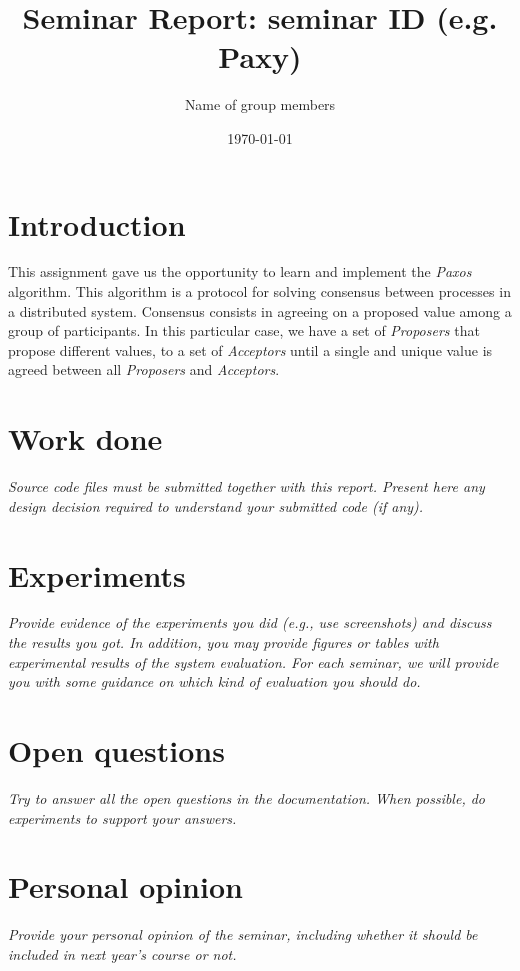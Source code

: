 \documentclass[a4paper, 11pt]{article}
\title{Seminar Report: seminar ID (e.g. Paxy)}
\author{Name of group members}
\date{\today{}}
\begin{document}
\maketitle

\section{Introduction}

This assignment gave us the opportunity to learn and implement the \textit{Paxos} algorithm. This algorithm is a protocol for solving consensus between processes in a distributed system. Consensus consists in agreeing on a proposed value among a group of participants. In this particular case, we have a set of \textit{Proposers} that propose different values, to a set of \textit{Acceptors} until a single and unique value is agreed between all \textit{Proposers} and \textit{Acceptors}.

\section{Work done}

\textit{Source code files must be submitted together with this report. Present here any design decision required to understand your submitted code (if any).}

\section{Experiments}

\textit{Provide evidence of the experiments you did (e.g., use screenshots) and discuss the results you got. In addition, you may provide figures or tables with experimental results of the system evaluation. For each seminar, we will provide you with some guidance on which kind of evaluation you should do.}

\section{Open questions}

\textit{Try to answer all the open questions in the documentation. When possible, do experiments to support your answers.}

\section{Personal opinion}

\textit{Provide your personal opinion of the seminar, including whether it should be included in next year's course or not.}
\end{document}
